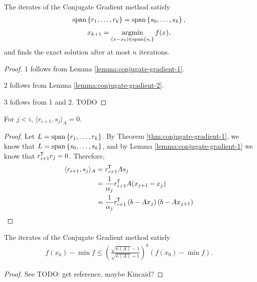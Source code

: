 \begin{thm}\label{thm:conjugate-gradient-1}
    The iterates of the Conjugate Gradient method satisfy
    \begin{align*}
        \operatorname{span}\left\{r_1, \ldots, r_k\right\} = \operatorname{span}\left\{s_0, \ldots, s_k\right\},
    \end{align*}
    \begin{align*}
        x_{k+1} = \operatorname*{argmin}_{(x-x_0) \in \operatorname{span}\{s_i\}}f(x),
    \end{align*}
    and finds the exact solution after at most $n$ iterations.
\end{thm}

\begin{proof}
    1 follows from Lemma \ref{lemma:conjugate-gradient-1}.

    2 follows from Lemma \ref{lemma:conjugate-gradient-2}.

    3 follows from 1 and 2.
    {\color{red}TODO}
\end{proof}

\begin{lemma}
    For $j < i$, $\langle r_{i+1}, s_j\rangle_{A} = 0$.
\end{lemma}

\begin{proof}
    Let $L = \operatorname{span}\left\{r_1, \ldots, r_k\right\}$. By Theorem \ref{thm:conjugate-gradient-1}, we know that $L = \operatorname{span}\left\{s_0, \ldots, s_k\right\}$, and by Lemma \ref{lemma:conjugate-gradient-1} we know that $r_{i+1}^{\mkern-1.5mu\mathsf{T}}r_{j} = 0$. Therefore,
    \begin{align*}
        \langle r_{i+1}, s_j\rangle_{A} &= r_{i+1}^{\mkern-1.5mu\mathsf{T}}As_j \\
        &= \frac{1}{\alpha_j}r_{i+1}^{\mkern-1.5mu\mathsf{T}}A(x_{j+1}-x_j) \\
        &= \frac{1}{\alpha_j}r_{i+1}^{\mkern-1.5mu\mathsf{T}}\left(b-Ax_j\right)\left(b-Ax_{j+1}\right) \\
    \end{align*}
\end{proof}

\begin{thm}
    The iterates of the Conjugate Gradient method satisfy
    \begin{align*}
        f(x_k)-\min f \leq \left(\frac{\sqrt{\kappa(A)}-1}{\sqrt{\kappa(A)}+1}\right)^{k}\left(f(x_0)-\min f\right).
    \end{align*}
\end{thm}

\begin{proof}
    See {\color{red}TODO: get reference, maybe Kincaid?}
\end{proof}

